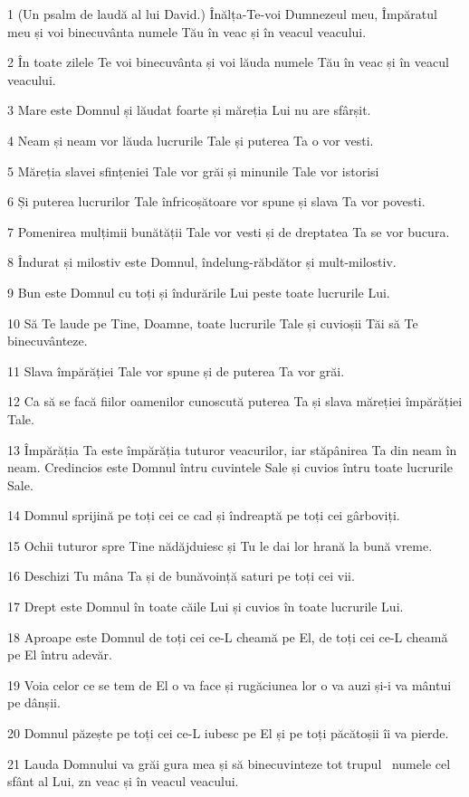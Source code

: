 \par 1 (Un psalm de laudă al lui David.) Înălța-Te-voi Dumnezeul meu, Împăratul meu și voi binecuvânta numele Tău în veac și în veacul veacului.
\par 2 În toate zilele Te voi binecuvânta și voi lăuda numele Tău în veac și în veacul veacului.
\par 3 Mare este Domnul și lăudat foarte și măreția Lui nu are sfârșit.
\par 4 Neam și neam vor lăuda lucrurile Tale și puterea Ta o vor vesti.
\par 5 Măreția slavei sfințeniei Tale vor grăi și minunile Tale vor istorisi
\par 6 Și puterea lucrurilor Tale înfricoșătoare vor spune și slava Ta vor povesti.
\par 7 Pomenirea mulțimii bunătății Tale vor vesti și de dreptatea Ta se vor bucura.
\par 8 Îndurat și milostiv este Domnul, îndelung-răbdător și mult-milostiv.
\par 9 Bun este Domnul cu toți și îndurările Lui peste toate lucrurile Lui.
\par 10 Să Te laude pe Tine, Doamne, toate lucrurile Tale și cuvioșii Tăi să Te binecuvânteze.
\par 11 Slava împărăției Tale vor spune și de puterea Ta vor grăi.
\par 12 Ca să se facă fiilor oamenilor cunoscută puterea Ta și slava măreției împărăției Tale.
\par 13 Împărăția Ta este împărăția tuturor veacurilor, iar stăpânirea Ta din neam în neam. Credincios este Domnul întru cuvintele Sale și cuvios întru toate lucrurile Sale.
\par 14 Domnul sprijină pe toți cei ce cad și îndreaptă pe toți cei gârboviți.
\par 15 Ochii tuturor spre Tine nădăjduiesc și Tu le dai lor hrană la bună vreme.
\par 16 Deschizi Tu mâna Ta și de bunăvoință saturi pe toți cei vii.
\par 17 Drept este Domnul în toate căile Lui și cuvios în toate lucrurile Lui.
\par 18 Aproape este Domnul de toți cei ce-L cheamă pe El, de toți cei ce-L cheamă pe El întru adevăr.
\par 19 Voia celor ce se tem de El o va face și rugăciunea lor o va auzi și-i va mântui pe dânșii.
\par 20 Domnul păzește pe toți cei ce-L iubesc pe El și pe toți păcătoșii îi va pierde.
\par 21 Lauda Domnului va grăi gura mea și să binecuvinteze tot trupul  numele cel sfânt al Lui, zn veac și în veacul veacului.

